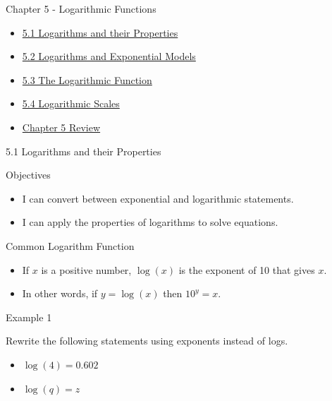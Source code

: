 \documentclass[ignorenonframetext,]{beamer}
\date{}
\providecommand{\tightlist}{%
  \setlength{\itemsep}{0pt}\setlength{\parskip}{0pt}}
\begin{document}
\begin{frame}{Chapter 5 - Logarithmic Functions}

\begin{itemize}
\tightlist
\item
  \protect\hyperlink{5.1-logarithms-and-their-properties}{5.1 Logarithms
  and their Properties}
\item
  \protect\hyperlink{5.2-logarithms-and-exponential-models}{5.2
  Logarithms and Exponential Models}
\item
  \protect\hyperlink{5.3-the-logarithmic-function}{5.3 The Logarithmic
  Function}
\item
  \protect\hyperlink{5.4-logarithmic-scales}{5.4 Logarithmic Scales}
\item
  \protect\hyperlink{chapter-5-review}{Chapter 5 Review}
\end{itemize}

\end{frame}

\begin{frame}{5.1 Logarithms and their Properties}

\begin{block}{Objectives}

\begin{itemize}
\tightlist
\item
  I can convert between exponential and logarithmic statements.
\item
  I can apply the properties of logarithms to solve equations.
\end{itemize}

\end{block}

\end{frame}

\begin{frame}{Common Logarithm Function}

\begin{itemize}
\tightlist
\item
  If \(x\) is a positive number, \(\log(x)\) is the exponent of 10 that
  gives \(x\).
\item
  In other words, if \(y = \log(x)\) then \(10^y = x\).
\end{itemize}

\end{frame}

\begin{frame}{Example 1}

Rewrite the following statements using exponents instead of logs.

\begin{itemize}
\tightlist
\item
  \(\log(4) = 0.602\)
\item
  \(\log(q) = z\)
\end{itemize}

\end{frame}
\end{document}
